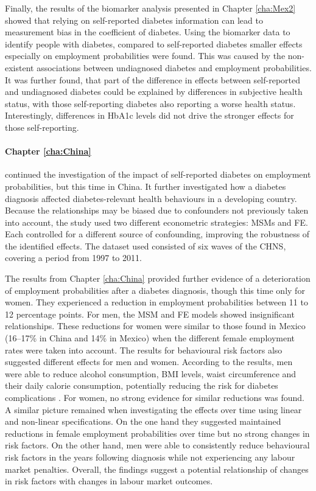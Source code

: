 Finally, the results of the biomarker analysis presented in Chapter \ref{cha:Mex2} showed that relying on self-reported diabetes information can lead to measurement bias in the coefficient of diabetes. Using the biomarker data to identify people with diabetes, compared to self-reported diabetes smaller effects especially on employment probabilities were found. This was caused by the non-existent associations between undiagnosed diabetes and employment probabilities. It was further found, that part of the difference in effects between self-reported and undiagnosed diabetes could be explained by differences in subjective health status, with those self-reporting diabetes also reporting a worse health status. Interestingly, differences in \ac{HbA1c} levels did not drive the stronger effects for those self-reporting. %


\paragraph{Chapter \ref{cha:China}} continued the investigation of the impact of self-reported diabetes on employment probabilities, but this time in China. It further investigated how a diabetes diagnosis affected diabetes-relevant health behaviours in a developing country. Because the relationships may be biased due to confounders not previously taken into account, the study used two different econometric strategies: \acp{MSM} and \ac{FE}. Each controlled for a different source of confounding, improving the robustness of the identified effects. The dataset used consisted of six waves of the \ac{CHNS}, covering a period from 1997 to 2011.

The results from Chapter \ref{cha:China} provided further evidence of a deterioration of employment probabilities after a diabetes diagnosis, though this time only for women. They experienced a reduction in employment probabilities between 11 to 12 percentage points. For men, the \ac{MSM} and \ac{FE} models showed insignificant relationships. These reductions for women were similar to those found in Mexico (16--17\% in China and 14\% in Mexico) when the different female employment rates were taken into account. The results for behavioural risk factors also suggested different effects for men and women. According to the results, men were able to reduce alcohol consumption, \ac{BMI} levels, waist circumference and their daily calorie consumption, potentially reducing the risk for diabetes complications \parencite{Wilding2014}. For women, no strong evidence for similar reductions was found. A similar picture remained when investigating the effects over time using linear and non-linear specifications. On the one hand they suggested maintained reductions in female employment probabilities over time but no strong changes in risk factors. On the other hand, men were able to consistently reduce behavioural risk factors in the years following diagnosis while not experiencing any labour market penalties. Overall, the findings suggest a potential relationship of changes in risk factors with changes in labour market outcomes.

